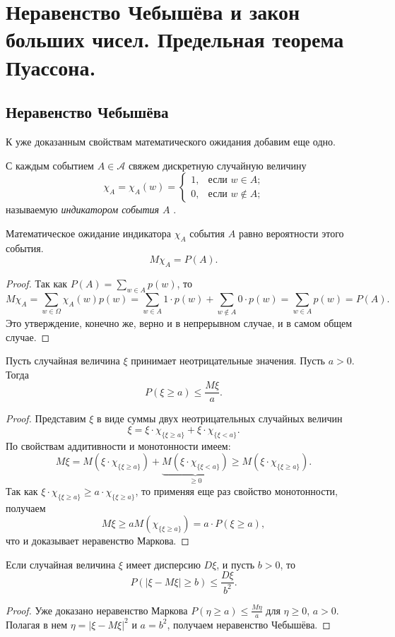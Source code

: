 \chapter{Неравенство Чебышёва и закон больших чисел. Предельная теорема Пуассона.}
\section{Неравенство Чебышёва}

К уже доказанным свойствам математического ожидания добавим еще одно.
\begin{defn}
С каждым событием $A \in \mathcal{A}$ свяжем дискретную случайную величину
$$
\chi_A =\chi_A(w)=\begin{cases}
1,&\text{если $w \in A$;}\\
0,&\text{если $w \notin A$;}
\end{cases}
$$
называемую \textit{индикатором события $A$} .
\end{defn}
\begin{thm}
Математическое ожидание индикатора $\chi_A$ события $A$ равно вероятности этого события.
$$
M\chi_A=P(A).
$$ 
\end{thm}
\begin{proof}
Так как $P(A)=\sum\limits_{w\in A}p(w)$, то 
$$
M\chi_A=\sum\limits_{w\in\Omega}\chi_A(w)p(w)=\sum\limits_{w\in A}1\cdot p(w)+\sum\limits_{w\notin A}0\cdot p(w)=\sum\limits_{w\in A}p(w)=P(A).
$$
Это утверждение, конечно же, верно и в непрерывном случае, и в самом общем случае.
\end{proof}

\begin{thm}
Пусть случайная величина $\xi$ принимает неотрицательные значения. Пусть $a>0$. Тогда 
$$
P(\xi \ge a)\le\frac{M\xi}{a}.
$$
\end{thm}
\begin{proof}
Представим $\xi$ в виде суммы двух неотрицательных случайных величин
$$
\xi = \xi\cdot\chi_{\{\xi\ge a\}}+\xi\cdot\chi_{\{\xi< a\}}.
$$
По свойствам аддитивности и монотонности имеем:
$$
M \xi=M (\xi\cdot\chi_{\{\xi\ge a\}})+\underbrace{M (\xi\cdot\chi_{\{\xi< a\}})}_{\ge 0} \ge M (\xi\cdot\chi_{\{\xi\ge a\}}).
$$
Так как $\xi\cdot\chi_{\{\xi\ge a\}}\ge a\cdot\chi_{\{\xi\ge a\}}$, то применяя еще раз свойство монотонности, получаем
$$
M \xi\ge aM (\chi_{\{\xi\ge a\}})=a\cdot P(\xi\ge a),
$$
что и доказывает неравенство Маркова.
\end{proof}

\begin{thm}
Если случайная величина $\xi$ имеет дисперсию $D \xi$, и пусть $b>0$, то
$$
P(|\xi-M \xi|\ge b ) \le\frac{D \xi}{b^2}.
$$
\end{thm} 
\begin{proof}
Уже доказано неравенство Маркова $P(\eta \ge a) \le \frac{M\eta}{a}$  для $\eta \ge 0$, $a>0$. Полагая в нем $\eta = |\xi-M \xi|^2$ и $a=b^2$, получаем неравенство Чебышёва.
\end{proof}

